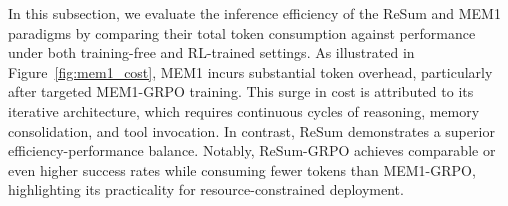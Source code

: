 In this subsection, we evaluate the inference efficiency of the ReSum and MEM1 paradigms by comparing their total token consumption against performance under both training-free and RL-trained settings. As illustrated in Figure~\ref{fig:mem1_cost}, MEM1 incurs substantial token overhead, particularly after targeted MEM1-GRPO training. This surge in cost is attributed to its iterative architecture, which requires continuous cycles of reasoning, memory consolidation, and tool invocation. In contrast, ReSum demonstrates a superior efficiency-performance balance. Notably, ReSum-GRPO achieves comparable or even higher success rates while consuming fewer tokens than MEM1-GRPO, highlighting its practicality for resource-constrained deployment.
